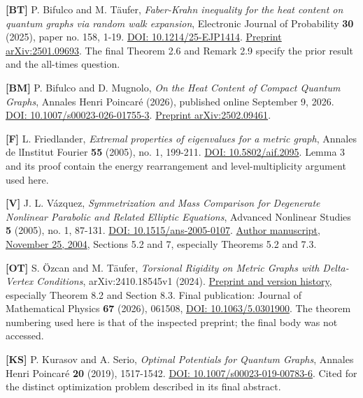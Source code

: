 \documentclass[11pt]{article}
\begin{document}
\textbf{{[}BT{]}} P. Bifulco and M. Täufer, \emph{Faber-Krahn inequality
for the heat content on quantum graphs via random walk expansion},
Electronic Journal of Probability \textbf{30} (2025), paper no. 158,
1-19. \href{https://doi.org/10.1214/25-EJP1414}{DOI:
10.1214/25-EJP1414}. \href{https://arxiv.org/abs/2501.09693}{Preprint
arXiv:2501.09693}. The final Theorem 2.6 and Remark 2.9 specify the
prior result and the all-times question.

\textbf{{[}BM{]}} P. Bifulco and D. Mugnolo, \emph{On the Heat Content
of Compact Quantum Graphs}, Annales Henri Poincaré (2026), published
online September 9, 2026.
\href{https://doi.org/10.1007/s00023-026-01755-3}{DOI:
10.1007/s00023-026-01755-3}.
\href{https://arxiv.org/abs/2502.09461}{Preprint arXiv:2502.09461}.

\textbf{{[}F{]}} L. Friedlander, \emph{Extremal properties of
eigenvalues for a metric graph}, Annales de l\textquotesingle Institut
Fourier \textbf{55} (2005), no. 1, 199-211.
\href{https://doi.org/10.5802/aif.2095}{DOI: 10.5802/aif.2095}. Lemma 3
and its proof contain the energy rearrangement and level-multiplicity
argument used here.

\textbf{{[}V{]}} J. L. Vázquez, \emph{Symmetrization and Mass Comparison
for Degenerate Nonlinear Parabolic and Related Elliptic Equations},
Advanced Nonlinear Studies \textbf{5} (2005), no. 1, 87-131.
\href{https://doi.org/10.1515/ans-2005-0107}{DOI:
10.1515/ans-2005-0107}.
\href{https://verso.mat.uam.es/~juanluis.vazquez/SymmJANS04.pdf}{Author
manuscript, November 25, 2004}, Sections 5.2 and 7, especially Theorems
5.2 and 7.3.

\textbf{{[}OT{]}} S. Özcan and M. Täufer, \emph{Torsional Rigidity on
Metric Graphs with Delta-Vertex Conditions}, arXiv:2410.18545v1 (2024).
\href{https://arxiv.org/abs/2410.18545}{Preprint and version history},
especially Theorem 8.2 and Section 8.3. Final publication: Journal of
Mathematical Physics \textbf{67} (2026), 061508,
\href{https://doi.org/10.1063/5.0301900}{DOI: 10.1063/5.0301900}. The
theorem numbering used here is that of the inspected preprint; the final
body was not accessed.

\textbf{{[}KS{]}} P. Kurasov and A. Serio, \emph{Optimal Potentials for
Quantum Graphs}, Annales Henri Poincaré \textbf{20} (2019), 1517-1542.
\href{https://doi.org/10.1007/s00023-019-00783-6}{DOI:
10.1007/s00023-019-00783-6}. Cited for the distinct optimization problem
described in its final abstract.
\end{document}
